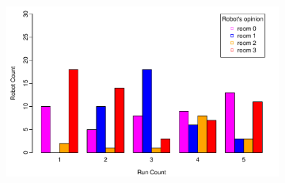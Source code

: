 \documentclass{llncs}
\begin{document}
\begin{figure}[h!]
\begin{subfigure}[b]{0.67\textwidth}
                \includegraphics[width=\textwidth]{PLOT/EXP/exp5}
                \label{fig:exp1}
        \end{subfigure}
        

\end{figure}
\end{document}
